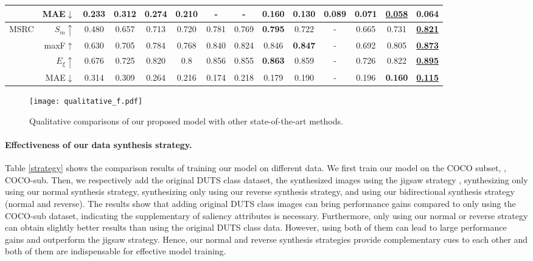 \documentclass[10pt,twocolumn,letterpaper]{article}
\def\blu#1{\textbf{\color{blue} #1}} %
\def\red#1{\textbf{\color{red}\underline{#1}}} %
\begin{document}
\begin{table*}[t]
\begin{tabular}{lr|ccccccccccc|c}
    \cite{zhang2015co}& MAE$\downarrow$ &0.233 &0.312 &0.274 &0.210	&-	&-	&0.160	&0.130	&0.089	&0.071	&\red{0.058} &\blu{0.064}\\
     \hline
  \multirow{4}{*}{MSRC}
    & $S_m\uparrow$   &0.480 &0.657	&0.713 &0.720 &0.781 &0.769	&\blu{0.795} &0.722	&-	&0.665	&0.731	&\red{0.821} \\
    & maxF$\uparrow$  &0.630 &0.705 &0.784 &0.768 &0.840 &0.824 &0.846 &\blu{0.847} &- &0.692 &0.805 &\red{0.873}\\
    & $E_\xi\uparrow$  &0.676 &0.725 &0.820 &0.8 &0.856 &0.855 &\blu{0.863} &0.859 &-	&0.726 &0.822 &\red{0.895}\\
    \cite{winn2005object}& MAE$\downarrow$ &0.314 &0.309 &0.264 &0.216 &0.174 &0.218 &0.179 &0.190	&- &0.196 &\blu{0.160} &\red{0.115} \\
     \hline
  \end{tabular}
  \label{SOTA}
\end{table*}

\begin{figure*}[t]
  \graphicspath{{Figures/qualitative/}}
  \centering
  \texttt{[image: qualitative\_f.pdf]}
  \caption{Qualitative comparisons of our proposed model with other state-of-the-art methods.}
  \label{qualitative}
  \vspace{-0.3cm}
\end{figure*}


\vspace{-3mm}
\paragraph{Effectiveness of our data synthesis strategy.}
Table \ref{strategy} shows the comparison results of training our model on different data.
We first train our model on the COCO subset, \ie, COCO-sub. Then, we respectively add the original DUTS class dataset, the synthesized images using the jigsaw strategy \cite{zhang2020gicd}, synthesizing only using our normal synthesis strategy, synthesizing only using our reverse synthesis strategy, and using our bidirectional synthesis strategy (normal and reverse).
The results show that adding original DUTS class images can bring performance gains compared to only using the COCO-sub dataset, indicating the supplementary of saliency attributes is necessary. 
Furthermore, only using our normal or reverse strategy can obtain slightly better results than using the original DUTS class data. However, using both of them can lead to large performance gains and outperform the jigsaw strategy. Hence, our normal and reverse synthesis strategies provide complementary cues to each other and both of them are indispensable for effective model training.
\end{document}
